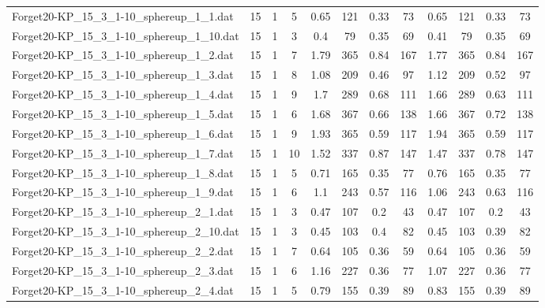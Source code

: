 \begin{sidewaystable}[!ht]
{\begin{tabular}{lccccccccccc}
Forget20-KP\_15\_3\_1-10\_sphereup\_1\_1.dat & 15 & 1 & 5 & 0.65 & 121 &  \textcolor{blue2}{0.33} & 73 & 0.65 & 121 &  \textcolor{blue2}{0.33} & 73 \\
Forget20-KP\_15\_3\_1-10\_sphereup\_1\_10.dat & 15 & 1 & 3 & 0.4 & 79 &  \textcolor{blue2}{0.35} & 69 & 0.41 & 79 &  \textcolor{blue2}{0.35} & 69 \\
Forget20-KP\_15\_3\_1-10\_sphereup\_1\_2.dat & 15 & 1 & 7 & 1.79 & 365 &  \textcolor{blue2}{0.84} & 167 & 1.77 & 365 &  \textcolor{blue2}{0.84} & 167 \\
Forget20-KP\_15\_3\_1-10\_sphereup\_1\_3.dat & 15 & 1 & 8 & 1.08 & 209 &  \textcolor{blue2}{0.46} & 97 & 1.12 & 209 & 0.52 & 97 \\
Forget20-KP\_15\_3\_1-10\_sphereup\_1\_4.dat & 15 & 1 & 9 & 1.7 & 289 & 0.68 & 111 & 1.66 & 289 &  \textcolor{blue2}{0.63} & 111 \\
Forget20-KP\_15\_3\_1-10\_sphereup\_1\_5.dat & 15 & 1 & 6 & 1.68 & 367 &  \textcolor{blue2}{0.66} & 138 & 1.66 & 367 & 0.72 & 138 \\
Forget20-KP\_15\_3\_1-10\_sphereup\_1\_6.dat & 15 & 1 & 9 & 1.93 & 365 &  \textcolor{blue2}{0.59} & 117 & 1.94 & 365 &  \textcolor{blue2}{0.59} & 117 \\
Forget20-KP\_15\_3\_1-10\_sphereup\_1\_7.dat & 15 & 1 & 10 & 1.52 & 337 & 0.87 & 147 & 1.47 & 337 &  \textcolor{blue2}{0.78} & 147 \\
Forget20-KP\_15\_3\_1-10\_sphereup\_1\_8.dat & 15 & 1 & 5 & 0.71 & 165 &  \textcolor{blue2}{0.35} & 77 & 0.76 & 165 &  \textcolor{blue2}{0.35} & 77 \\
Forget20-KP\_15\_3\_1-10\_sphereup\_1\_9.dat & 15 & 1 & 6 & 1.1 & 243 &  \textcolor{blue2}{0.57} & 116 & 1.06 & 243 & 0.63 & 116 \\
Forget20-KP\_15\_3\_1-10\_sphereup\_2\_1.dat & 15 & 1 & 3 & 0.47 & 107 &  \textcolor{blue2}{0.2} & 43 & 0.47 & 107 &  \textcolor{blue2}{0.2} & 43 \\
Forget20-KP\_15\_3\_1-10\_sphereup\_2\_10.dat & 15 & 1 & 3 & 0.45 & 103 & 0.4 & 82 & 0.45 & 103 &  \textcolor{blue2}{0.39} & 82 \\
Forget20-KP\_15\_3\_1-10\_sphereup\_2\_2.dat & 15 & 1 & 7 & 0.64 & 105 &  \textcolor{blue2}{0.36} & 59 & 0.64 & 105 &  \textcolor{blue2}{0.36} & 59 \\
Forget20-KP\_15\_3\_1-10\_sphereup\_2\_3.dat & 15 & 1 & 6 & 1.16 & 227 &  \textcolor{blue2}{0.36} & 77 & 1.07 & 227 &  \textcolor{blue2}{0.36} & 77 \\
Forget20-KP\_15\_3\_1-10\_sphereup\_2\_4.dat & 15 & 1 & 5 & 0.79 & 155 &  \textcolor{blue2}{0.39} & 89 & 0.83 & 155 &  \textcolor{blue2}{0.39} & 89 \\

\end{tabular}}
\end{sidewaystable}
